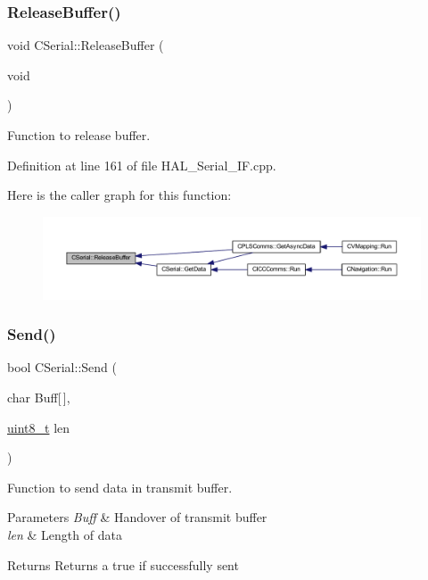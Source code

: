\subsubsection{\texorpdfstring{Release\+Buffer()}{ReleaseBuffer()}}
{\footnotesize\ttfamily void C\+Serial\+::\+Release\+Buffer (\begin{DoxyParamCaption}\item[{void}]{ }\end{DoxyParamCaption})}



Function to release buffer. 



Definition at line 161 of file H\+A\+L\+\_\+\+Serial\+\_\+\+I\+F.\+cpp.

Here is the caller graph for this function\+:
\nopagebreak
\begin{figure}[H]
\begin{center}
\leavevmode
\includegraphics[width=350pt]{class_c_serial_a941e5cae2ca04518925a3b32f51110a6_icgraph}
\end{center}
\end{figure}
\mbox{\label{class_c_serial_ae5bec6d6a1c75839ae02cf0069d1f08e}} 
\subsubsection{\texorpdfstring{Send()}{Send()}}
{\footnotesize\ttfamily bool C\+Serial\+::\+Send (\begin{DoxyParamCaption}\item[{char}]{Buff\mbox{[}$\,$\mbox{]},  }\item[{\mbox{\hyperlink{_a_d_a_s___types_8h_aba7bc1797add20fe3efdf37ced1182c5}{uint8\+\_\+t}}}]{len }\end{DoxyParamCaption})}



Function to send data in transmit buffer. 


\begin{DoxyParams}{Parameters}
{\em Buff} & Handover of transmit buffer \\
\hline
{\em len} & Length of data \\
\hline
\end{DoxyParams}
\begin{DoxyReturn}{Returns}
Returns a true if successfully sent 
\end{DoxyReturn}


